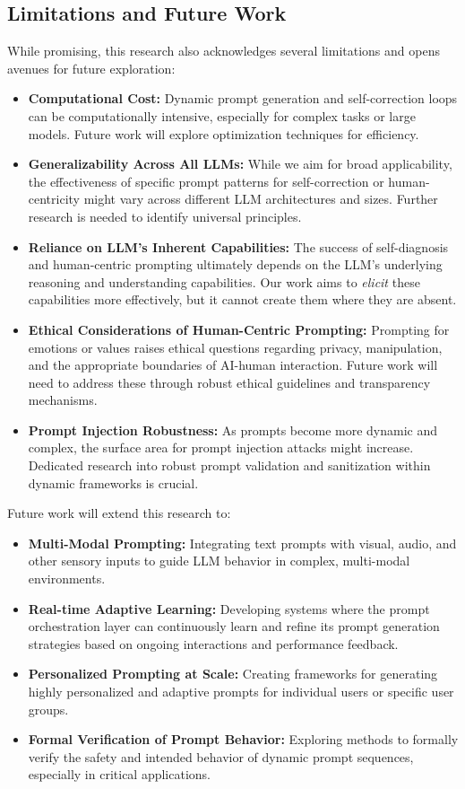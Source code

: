 \documentclass{article}
\begin{document}
\subsection{Limitations and Future Work}
While promising, this research also acknowledges several limitations and opens avenues for future exploration:
\begin{itemize}
    \item \textbf{Computational Cost:} Dynamic prompt generation and self-correction loops can be computationally intensive, especially for complex tasks or large models. Future work will explore optimization techniques for efficiency.
    \item \textbf{Generalizability Across All LLMs:} While we aim for broad applicability, the effectiveness of specific prompt patterns for self-correction or human-centricity might vary across different LLM architectures and sizes. Further research is needed to identify universal principles.
    \item \textbf{Reliance on LLM's Inherent Capabilities:} The success of self-diagnosis and human-centric prompting ultimately depends on the LLM's underlying reasoning and understanding capabilities. Our work aims to \textit{elicit} these capabilities more effectively, but it cannot create them where they are absent.
    \item \textbf{Ethical Considerations of Human-Centric Prompting:} Prompting for emotions or values raises ethical questions regarding privacy, manipulation, and the appropriate boundaries of AI-human interaction. Future work will need to address these through robust ethical guidelines and transparency mechanisms.
    \item \textbf{Prompt Injection Robustness:} As prompts become more dynamic and complex, the surface area for prompt injection attacks might increase. Dedicated research into robust prompt validation and sanitization within dynamic frameworks is crucial.
\end{itemize}

Future work will extend this research to:
\begin{itemize}
    \item \textbf{Multi-Modal Prompting:} Integrating text prompts with visual, audio, and other sensory inputs to guide LLM behavior in complex, multi-modal environments.
    \item \textbf{Real-time Adaptive Learning:} Developing systems where the prompt orchestration layer can continuously learn and refine its prompt generation strategies based on ongoing interactions and performance feedback.
    \item \textbf{Personalized Prompting at Scale:} Creating frameworks for generating highly personalized and adaptive prompts for individual users or specific user groups.
    \item \textbf{Formal Verification of Prompt Behavior:} Exploring methods to formally verify the safety and intended behavior of dynamic prompt sequences, especially in critical applications.
\end{itemize}
\end{document}
